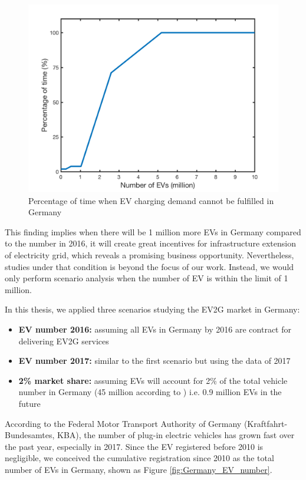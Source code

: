 \begin{figure}[h!]
	\centering
	\includegraphics[width=0.95\linewidth]{Figures/EV_nan_percentage}
	\caption{Percentage of time when EV charging demand cannot be fulfilled in Germany}
	\label{fig:EV_nan_percentageg}
\end{figure}

This finding implies when there will be 1 million more EVs in Germany compared to the number in 2016, it will create great incentives for infrastructure extension of electricity grid, which reveals a promising business opportunity. Nevertheless, studies under that condition is beyond the focus of our work. Instead, we would only perform scenario analysis when the number of EV is within the limit of 1 million. 

In this thesis, we applied three scenarios studying the EV2G market in Germany:

\begin{itemize}
	\item \textbf{EV number 2016:} assuming all  EVs in Germany by 2016 are contract for delivering EV2G services
	\item \textbf{EV number 2017:} similar to the first scenario but using the data of 2017
	\item \textbf{2\% market share:} assuming EVs will account for 2\% of the total vehicle number in Germany (45 million according to \cite{Eurostat_de_v}) i.e. 0.9 million EVs in the future
\end{itemize}

According to the Federal Motor Transport Authority of Germany (Kraftfahrt-Bundesamtes, KBA)\cite{KBA2017}, the number of plug-in electric vehicles has grown fast over the past year, especially in 2017. Since the EV registered before 2010 is negligible, we conceived the cumulative registration since 2010 as the total number of EVs in Germany, shown as Figure \ref{fig:Germany_EV_number}.

